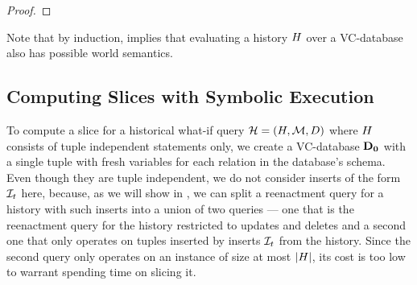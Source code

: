 {\begin{proof}

\end{proof}
}

Note that by induction,  implies that evaluating a history $H$ over a  VC-database also has possible world semantics.



\subsection{Computing Slices with Symbolic Execution}\label{sec:symbolic-exe}

To compute a slice for a historical what-if query $\mathcal{H} = (H, \mathcal{M}, D)$  %
where $H$ consists of tuple independent statements only,
we create a VC-database $\mathbf{D_0}$ with a single tuple with fresh variables for each relation in the database's schema.
Even though they are tuple independent, we do not consider inserts of the form $\mathcal{I}_{t}$ here, because, as we will show in , we can split a reenactment query for a history with such inserts into a union of two queries --- one that is the reenactment query for the history restricted to updates and deletes and a second one that only operates on tuples inserted by inserts $\mathcal{I}_{t}$ from the history. Since the second query only operates on an instance of size at most $\left|{H}\right|$, its cost is too low to warrant spending time on slicing it.

